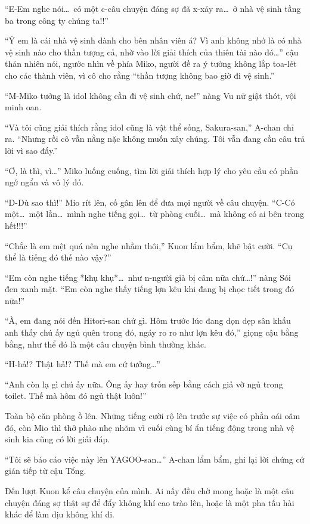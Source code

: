 \documentclass[../main.tex]{subfiles}
\begin{document}
``E-Em nghe nói\dots\ có một c-câu chuyện đáng sợ đã x-xảy ra\dots\ ở nhà vệ sinh tầng ba trong công ty chúng ta!!''

``Ý em là cái nhà vệ sinh dành cho bên nhân viên á? Vì anh không nhớ là có nhà vệ sinh nào cho thần tượng cả, nhờ vào lời giải thích của thiên tài nào đó\dots'' cậu thản nhiên nói, ngước nhìn về phía Miko, người đề ra ý tưởng không lắp toa-lét cho các thành viên, vì cô cho rằng ``thần tượng không bao giờ đi vệ sinh.''

``M-Miko tưởng là idol không cần đi vệ sinh chứ, ne!'' nàng Vu nữ giật thót, vội minh oan.

``Và tôi cũng giải thích rằng idol cũng là vật thể sống, Sakura-san,'' A-chan chỉ ra. ``Nhưng rồi cô vẫn nằng nặc không muốn xây chúng. Tôi vẫn đang cần câu trả lời vì sao đấy.''

``Ơ, là thì, vì\dots'' Miko luống cuống, tìm lời giải thích hợp lý cho yêu cầu có phần ngớ ngẩn và vô lý đó.

``D-Dù sao thì!'' Mio rít lên, cố gân lên để đưa mọi người về câu chuyện. ``C-Có một\dots\ một lần\dots\ mình nghe tiếng gọi\dots\ từ phòng cuối\dots\ mà không có ai bên trong hết!!!''

``Chắc là em mệt quá nên nghe nhầm thôi,'' Kuon lẩm bẩm, khẽ bật cười. ``Cụ thể là tiếng đó thế nào vậy?''

``Em còn nghe tiếng *khụ khụ*\dots\ như n-người già bị câm nữa chứ\dots!'' nàng Sói đen xanh mặt. ``Em còn nghe thấy tiếng lợn kêu khi đang bị chọc tiết trong đó nữa!''

``À, em đang nói đến Hitori-san chứ gì. Hôm trước lúc đang dọn dẹp sân khấu anh thấy chú ấy ngủ quên trong đó, ngáy ro ro như lợn kêu đó,'' giọng cậu bằng bằng, như thể đó là một câu chuyện bình thường khác.

``H-hả!? Thật hả!? Thế mà em cứ tưởng\dots''

``Anh còn lạ gì chú ấy nữa. Ông ấy hay trốn sếp bằng cách giả vờ ngủ trong toilet. Thế mà hôm đó ngủ thật luôn!''

Toàn bộ căn phòng ồ lên. Những tiếng cười rộ lên trước sự việc có phần oái oăm đó, còn Mio thì thở phào nhẹ nhõm vì cuối cùng bí ẩn tiếng động trong nhà vệ sinh kia cũng có lời giải đáp.

``Tôi sẽ báo cáo việc này lên YAGOO-san\dots'' A-chan lẩm bẩm, ghi lại lời chứng cứ gián tiếp từ cậu Tổng.

Đến lượt Kuon kể câu chuyện của mình. Ai nấy đều chờ mong hoặc là một câu chuyện đáng sợ thật sự để đẩy không khí cao trào lên, hoặc là một pha tấu hài khác để làm dịu không khí đi.
\end{document}
